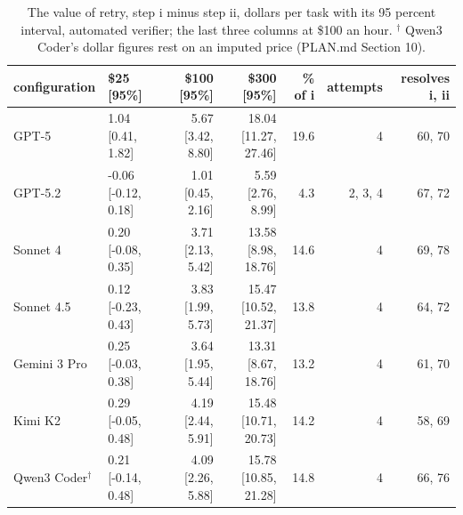 \begin{table}[t]
\centering
\small
\caption{The value of retry, step i minus step ii, dollars per task with its 95 percent interval, automated verifier; the last three columns at \$100 an hour. $^\dagger$ Qwen3 Coder's dollar figures rest on an imputed price (PLAN.md Section 10).}
\label{tab:table_retry}
\begin{tabular}{llrrrrr}
\toprule
configuration & \$25 [95\%] & \$100 [95\%] & \$300 [95\%] & \% of i & attempts & resolves i, ii \\
\midrule
GPT-5 & 1.04 [0.41, 1.82] & 5.67 [3.42, 8.80] & 18.04 [11.27, 27.46] & 19.6 & 4 & 60, 70 \\
\midrule
GPT-5.2 & -0.06 [-0.12, 0.18] & 1.01 [0.45, 2.16] & 5.59 [2.76, 8.99] & 4.3 & 2, 3, 4 & 67, 72 \\
\midrule
Sonnet 4 & 0.20 [-0.08, 0.35] & 3.71 [2.13, 5.42] & 13.58 [8.98, 18.76] & 14.6 & 4 & 69, 78 \\
\midrule
Sonnet 4.5 & 0.12 [-0.23, 0.43] & 3.83 [1.99, 5.73] & 15.47 [10.52, 21.37] & 13.8 & 4 & 64, 72 \\
\midrule
Gemini 3 Pro & 0.25 [-0.03, 0.38] & 3.64 [1.95, 5.44] & 13.31 [8.67, 18.76] & 13.2 & 4 & 61, 70 \\
\midrule
Kimi K2 & 0.29 [-0.05, 0.48] & 4.19 [2.44, 5.91] & 15.48 [10.71, 20.73] & 14.2 & 4 & 58, 69 \\
\midrule
Qwen3 Coder$^\dagger$ & 0.21 [-0.14, 0.48] & 4.09 [2.26, 5.88] & 15.78 [10.85, 21.28] & 14.8 & 4 & 66, 76 \\
\bottomrule
\end{tabular}
\end{table}
